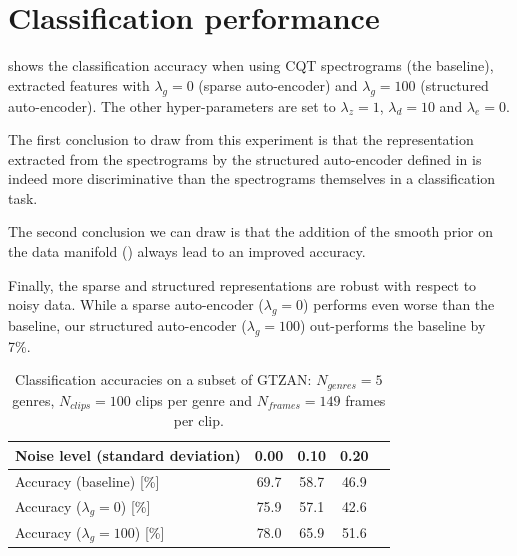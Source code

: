 

\section{Classification performance}

 shows the classification accuracy when using \gls{CQT} spectrograms (the baseline), extracted features with $\lambda_g=0$ (sparse auto-encoder) and $\lambda_g=100$ (structured auto-encoder). The other hyper-parameters are set to $\lambda_z=1$, $\lambda_d=10$ and $\lambda_e=0$.

The first conclusion to draw from this experiment is that the representation extracted from the spectrograms by the structured auto-encoder defined in  is indeed more discriminative than the spectrograms themselves in a classification task.

The second conclusion we can draw is that the addition of the smooth prior on the data manifold () always lead to an improved accuracy.

Finally, the sparse and structured representations are robust with respect to noisy data. While a sparse auto-encoder ($\lambda_g=0$) performs even worse than the baseline, our structured auto-encoder ($\lambda_g=100$) out-performs the baseline by 7\%.

\begin {table}[H]
\begin{center}
	\begin{tabular}{|l|c|c|c|c|}
		\hline
		Noise level (standard deviation)  & 0.00 & 0.10 & 0.20 \\
		\hline
		Accuracy (baseline) [\%]          & 69.7 & 58.7 & 46.9 \\
		Accuracy ($\lambda_g=0$) [\%]     & 75.9 & 57.1 & 42.6 \\
		Accuracy ($\lambda_g=100$) [\%]   & 78.0 & 65.9 & 51.6 \\
		\hline
	\end{tabular}
	\caption{Classification accuracies on a subset of GTZAN: $N_{genres} = 5$ genres, $N_{clips} = 100$ clips per genre and $N_{frames} = 149$ frames per clip.}
	\label{tab:classification_accuracy}
\end{center}
\end{table}

